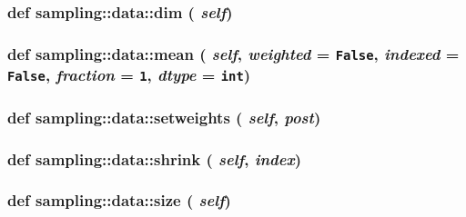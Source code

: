 \hypertarget{classsampling_1_1data_91e88ff11c431b763c1b073fc10ef9cc}{
\subsubsection[{dim}]{\setlength{\rightskip}{0pt plus 5cm}def sampling::data::dim ( {\em self})}}
\label{classsampling_1_1data_91e88ff11c431b763c1b073fc10ef9cc}


\hypertarget{classsampling_1_1data_043fedd9515c040a518b9f1571af5e40}{
\subsubsection[{mean}]{\setlength{\rightskip}{0pt plus 5cm}def sampling::data::mean ( {\em self}, \/   {\em weighted} = {\tt False}, \/   {\em indexed} = {\tt False}, \/   {\em fraction} = {\tt 1}, \/   {\em dtype} = {\tt int})}}
\label{classsampling_1_1data_043fedd9515c040a518b9f1571af5e40}


\hypertarget{classsampling_1_1data_ffd8218cbffd08dd6a5943e50dce29fb}{
\subsubsection[{setweights}]{\setlength{\rightskip}{0pt plus 5cm}def sampling::data::setweights ( {\em self}, \/   {\em post})}}
\label{classsampling_1_1data_ffd8218cbffd08dd6a5943e50dce29fb}


\hypertarget{classsampling_1_1data_97ca284cf4c50daa748273be76f0d18b}{
\subsubsection[{shrink}]{\setlength{\rightskip}{0pt plus 5cm}def sampling::data::shrink ( {\em self}, \/   {\em index})}}
\label{classsampling_1_1data_97ca284cf4c50daa748273be76f0d18b}


\hypertarget{classsampling_1_1data_e25008002e4e7869ec5047bf6b6bba36}{
\subsubsection[{size}]{\setlength{\rightskip}{0pt plus 5cm}def sampling::data::size ( {\em self})}}
\label{classsampling_1_1data_e25008002e4e7869ec5047bf6b6bba36}


